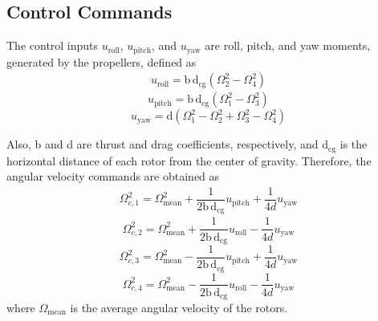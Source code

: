 \documentclass[conference]{IEEEtran}
\begin{document}
\subsection{Control Commands}
\noindent The control inputs $u_{\text{roll}}$, $u_{\text{pitch}}$, and $u_{\text{yaw}}$ are roll, pitch, and yaw moments, generated by the propellers, defined as
\begin{equation}
	\begin{split}
		u_{\text{roll}} = \mathrm{b\,d}_{\text{cg}} (\Omega_2^2 - \Omega_4^2)
	\end{split}
\end{equation}
\begin{equation}
	u_{\text{pitch}} = \mathrm{b\,d}_{\text{cg}} (\Omega_1^2 - \Omega_3^2) 
\end{equation}
\begin{equation}
	u_{\text{yaw}} = \mathrm{d} (\Omega_1^2 - \Omega_2^2 + \Omega_3^2 - \Omega_4^2)
\end{equation}

Also, b and d are thrust and drag coefficients, respectively, and $\mathrm{d}_{\text{cg}}$ is the horizontal distance of each rotor from the center of gravity. Therefore, the angular velocity commands are obtained as
\begin{equation}
	\begin{split}
		\Omega_{c, 1}^2 = \Omega_{\text{mean}}^2 + \dfrac{1}{2\mathrm{b\,d}_{\text{cg}}}u_{\text{pitch}} + \dfrac{1}{4d}u_{\text{yaw}} 
	\end{split}
\end{equation}
\begin{equation}
	\Omega_{c, 2}^2 = \Omega_{\text{mean}}^2 + \dfrac{1}{2\mathrm{b\,d}_{\text{cg}}}u_{\text{roll}} - \dfrac{1}{4d}u_{\text{yaw}}
\end{equation}
\begin{equation}
	\Omega_{c, 3}^2 = \Omega_{\text{mean}}^2 - \dfrac{1}{2\mathrm{b\,d}_{\text{cg}}}u_{\text{pitch}} + \dfrac{1}{4d}u_{\text{yaw}} 
\end{equation}
\begin{equation}
\Omega_{c, 4}^2 = \Omega_{\text{mean}}^2 - \dfrac{1}{2\mathrm{b\,d}_{\text{cg}}}u_{\text{roll}} - \dfrac{1}{4d}u_{\text{yaw}}
\end{equation}
where $\Omega_{\text{mean}}$ is the average angular velocity of the rotors.
\end{document}
